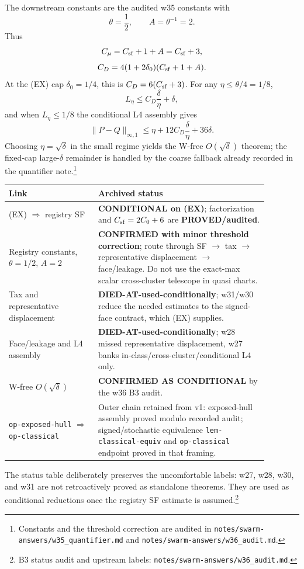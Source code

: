 \documentclass[11pt]{article}
\theoremstyle{plain}
\theoremstyle{definition}
\theoremstyle{remark}
\begin{document}
The downstream constants are the audited w35 constants with
\[
\theta=\frac{1}{2},\qquad A=\theta^{-1}=2.
\]
Thus
\[
C_\mu=C_{\rm sf}+1+A=C_{\rm sf}+3,
\]
\[
C_D=4(1+2\delta_0)(C_{\rm sf}+1+A).
\]
At the \textup{(EX)} cap $\delta_0=1/4$, this is
$C_D=6(C_{\rm sf}+3)$.  For any $\eta\le\theta/4=1/8$,
\[
L_\eta\le C_D\frac{\delta}{\eta}+\delta,
\]
and when $L_\eta\le1/8$ the conditional L4 assembly gives
\[
\|P-Q\|_{\infty,1}
\le \eta+12C_D\frac{\delta}{\eta}+36\delta.
\]
Choosing $\eta=\sqrt\delta$ in the small regime yields the W-free
$O(\sqrt\delta)$ theorem; the fixed-cap large-$\delta$ remainder is handled by
the coarse fallback already recorded in the quantifier note.\footnote{Constants
and the threshold correction are audited in
\texttt{notes/swarm-answers/w35\_quantifier.md} and
\texttt{notes/swarm-answers/w36\_audit.md}.}

\begin{center}
\begin{tabular}{p{0.30\linewidth}p{0.58\linewidth}}
\textbf{Link} & \textbf{Archived status} \\
\hline
\textup{(EX)} $\Rightarrow$ registry SF &
\textbf{CONDITIONAL on \textup{(EX)}}; factorization and $C_{\rm sf}=2C_0+6$
are \textbf{PROVED/audited}. \\
Registry constants, $\theta=1/2$, $A=2$ &
\textbf{CONFIRMED with minor threshold correction}; route through
SF $\to$ tax $\to$ representative displacement $\to$ face/leakage.  Do not use
the exact-max scalar cross-cluster telescope in quasi charts. \\
Tax and representative displacement &
\textbf{DIED-AT-used-conditionally}; w31/w30 reduce the needed estimates to
the signed-face contract, which \textup{(EX)} supplies. \\
Face/leakage and L4 assembly &
\textbf{DIED-AT-used-conditionally}; w28 missed representative displacement,
w27 banks in-class/cross-cluster/conditional L4 only. \\
W-free $O(\sqrt\delta)$ &
\textbf{CONFIRMED AS CONDITIONAL} by the w36 B3 audit. \\
\texttt{op-exposed-hull} $\Rightarrow$ \texttt{op-classical} &
Outer chain retained from v1: exposed-hull assembly proved modulo recorded
audit; signed/stochastic equivalence \texttt{lem-classical-equiv} and
\texttt{op-classical} endpoint proved in that framing. \\
\end{tabular}
\end{center}

\noindent The status table deliberately preserves the uncomfortable labels:
w27, w28, w30, and w31 are not retroactively proved as standalone theorems.
They are used as conditional reductions once the registry SF estimate is
assumed.\footnote{B3 status audit and upstream labels:
\texttt{notes/swarm-answers/w36\_audit.md}.}
\end{document}
